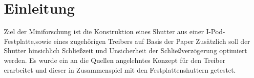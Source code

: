 \section{Einleitung}
Ziel der Miniforschung ist die Konstruktion eines Shutter aus einer I-Pod-Festplatte,sowie eines zugehörigen Treibers auf Basis der Paper %
Zusätzlich soll der Shutter hinsichlich Schließzeit und Unsicherheit der Schließverzögerung optimiert werden. Es wurde ein an die Quellen angelehntes Konzept für den Treiber erarbeitet und dieser in Zusammenspiel mit den Festplattenshuttern getestet.